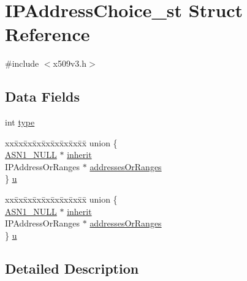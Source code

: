 \hypertarget{struct_i_p_address_choice__st}{}\section{I\+P\+Address\+Choice\+\_\+st Struct Reference}
\label{struct_i_p_address_choice__st}


{\ttfamily \#include $<$x509v3.\+h$>$}

\subsection*{Data Fields}
\begin{DoxyCompactItemize}
\item 
int \hyperlink{struct_i_p_address_choice__st_ac765329451135abec74c45e1897abf26}{type}
\item 
\begin{tabbing}
xx\=xx\=xx\=xx\=xx\=xx\=xx\=xx\=xx\=\kill
union \{\\
\>\hyperlink{crypto_2ossl__typ_8h_af03954fbfeac7d608f362307da7c57eb}{ASN1\_NULL} $\ast$ \hyperlink{struct_i_p_address_choice__st_aec983f5c76248f78211a9212bdd26548}{inherit}\\
\>IPAddressOrRanges $\ast$ \hyperlink{struct_i_p_address_choice__st_a22596ca1540f8b724214775d9308d5a4}{addressesOrRanges}\\
\} \hyperlink{struct_i_p_address_choice__st_af73bc54112b8253fbaa231edbaf382b8}{u}\\

\end{tabbing}\item 
\begin{tabbing}
xx\=xx\=xx\=xx\=xx\=xx\=xx\=xx\=xx\=\kill
union \{\\
\>\hyperlink{crypto_2ossl__typ_8h_af03954fbfeac7d608f362307da7c57eb}{ASN1\_NULL} $\ast$ \hyperlink{struct_i_p_address_choice__st_aec983f5c76248f78211a9212bdd26548}{inherit}\\
\>IPAddressOrRanges $\ast$ \hyperlink{struct_i_p_address_choice__st_a22596ca1540f8b724214775d9308d5a4}{addressesOrRanges}\\
\} \hyperlink{struct_i_p_address_choice__st_a412b6025239df192ba61fdc2f73443ac}{u}\\

\end{tabbing}\end{DoxyCompactItemize}


\subsection{Detailed Description}


